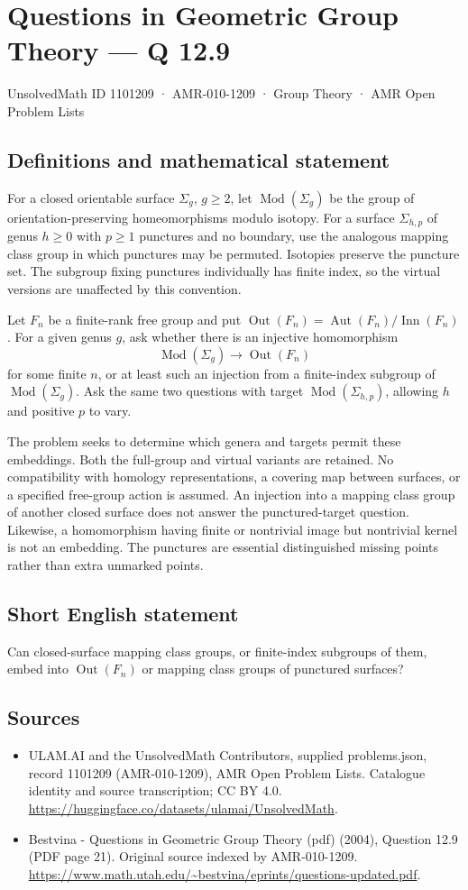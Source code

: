 \documentclass[11pt,a4paper]{article}
\begin{document}
\section*{Questions in Geometric Group Theory — Q 12.9}\label{1101209}
{\small UnsolvedMath ID 1101209 · AMR-010-1209 · Group Theory · AMR Open Problem Lists}
\subsection{Definitions and mathematical statement}
For a closed orientable surface $\Sigma_g$, $g\geq2$, let $\operatorname{Mod}(\Sigma_g)$ be the group of orientation-preserving homeomorphisms modulo isotopy. For a surface $\Sigma_{h,p}$ of genus $h\geq0$ with $p\geq1$ punctures and no boundary, use the analogous mapping class group in which punctures may be permuted. Isotopies preserve the puncture set. The subgroup fixing punctures individually has finite index, so the virtual versions are unaffected by this convention.

Let $F_n$ be a finite-rank free group and put $\operatorname{Out}(F_n)=\operatorname{Aut}(F_n)/\operatorname{Inn}(F_n)$. For a given genus $g$, ask whether there is an injective homomorphism
\[
 \operatorname{Mod}(\Sigma_g)\longrightarrow\operatorname{Out}(F_n)
\]
for some finite $n$, or at least such an injection from a finite-index subgroup of $\operatorname{Mod}(\Sigma_g)$. Ask the same two questions with target $\operatorname{Mod}(\Sigma_{h,p})$, allowing $h$ and positive $p$ to vary.

The problem seeks to determine which genera and targets permit these embeddings. Both the full-group and virtual variants are retained. No compatibility with homology representations, a covering map between surfaces, or a specified free-group action is assumed. An injection into a mapping class group of another closed surface does not answer the punctured-target question. Likewise, a homomorphism having finite or nontrivial image but nontrivial kernel is not an embedding. The punctures are essential distinguished missing points rather than extra unmarked points.
\subsection{Short English statement}
Can closed-surface mapping class groups, or finite-index subgroups of them, embed into $\operatorname{Out}(F_n)$ or mapping class groups of punctured surfaces?
\subsection{Sources}
\begin{itemize}
\item[S1] ULAM.AI and the UnsolvedMath Contributors, supplied problems.json, record 1101209 (AMR-010-1209), AMR Open Problem Lists. Catalogue identity and source transcription; CC BY 4.0.
\url{https://huggingface.co/datasets/ulamai/UnsolvedMath}.
\item[S2] Bestvina - Questions in Geometric Group Theory (pdf) (2004), Question 12.9 (PDF page 21). Original source indexed by AMR-010-1209.
\url{https://www.math.utah.edu/~bestvina/eprints/questions-updated.pdf}.
\end{itemize}
\end{document}
